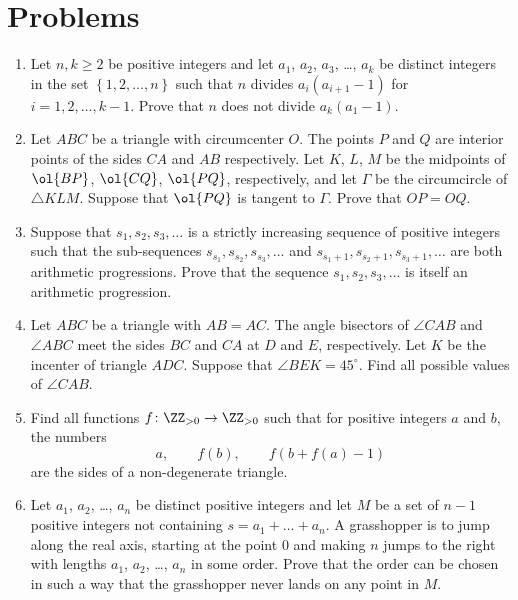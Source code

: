 \documentclass[11pt]{scrartcl}
\begin{document}
\section{Problems}
\begin{enumerate}[\bfseries 1.]
\item %
Let $n, k \ge 2$ be positive integers and let $a_1$, $a_2$, $a_3$, \dots, $a_k$
be distinct integers in the set $\left\{ 1,2,\dots,n \right\}$
such that $n$ divides $a_i(a_{i+1} - 1)$ for $i = 1,2,\dots,k-1$.
Prove that $n$ does not divide $a_k(a_1 - 1)$.

\item %
Let $ABC$ be a triangle with circumcenter $O$.
The points $P$ and $Q$ are interior points of the sides $CA$ and $AB$ respectively.
Let $K$, $L$, $M$ be the midpoints of $\ol{BP}$, $\ol{CQ}$, $\ol{PQ}$,
respectively, and let $\Gamma$ be the circumcircle of $\triangle KLM$.
Suppose that $\ol{PQ}$ is tangent to $\Gamma$. Prove that $OP = OQ$.

\item %
Suppose that $s_1,s_2,s_3, \dots$ is a strictly increasing sequence of
positive integers such that the sub-sequences $s_{s_1},s_{s_2},s_{s_3},\dots$
and $s_{s_1 + 1},s_{s_2 + 1},s_{s_3 + 1},\dots$ are both arithmetic progressions.
Prove that the sequence $s_1,s_2,s_3,\dots$ is itself an arithmetic progression.

\item %
Let $ABC$ be a triangle with $AB = AC$.
The angle bisectors of $\angle CAB$ and $\angle ABC$
meet the sides $BC$ and $CA$ at $D$ and $E$, respectively.
Let $K$ be the incenter of triangle $ADC$.
Suppose that $\angle BEK = 45^\circ$.
Find all possible values of $\angle CAB$.

\item %
Find all functions $f \colon \ZZ_{>0} \to \ZZ_{>0}$
such that for positive integers $a$ and $b$, the numbers
\[ a, \qquad f(b), \qquad f(b+f(a)-1) \]
are the sides of a non-degenerate triangle.

\item %
Let $a_1$, $a_2$, \dots, $a_n$ be distinct positive integers and
let $M$ be a set of $n-1$ positive integers not containing $s = a_1 + \dots + a_n$.
A grasshopper is to jump along the real axis, starting at the point $0$ and
making $n$ jumps to the right with lengths $a_1$, $a_2$, \dots, $a_n$ in some order.
Prove that the order can be chosen in such a way that
the grasshopper never lands on any point in $M$.

\end{enumerate}
\pagebreak
\end{document}
